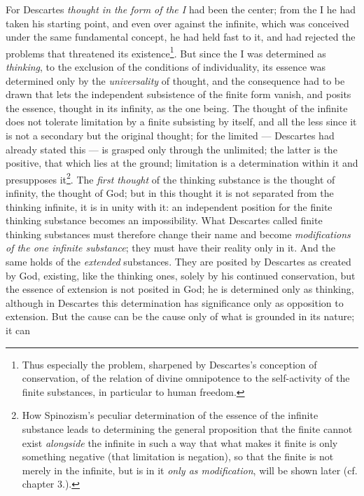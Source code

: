 \documentclass[12pt,a4paper,openany]{book}
\newcommand{\opage}[1]{\marginnote{\footnotesize\textit{[#1]}}}
\begin{document}
\opage{22}\setcounter{footnote}{0}For Descartes \emph{thought in the form of
the I} had been the center; from the I he had taken his starting point,
and even over against the infinite, which was conceived under the same
fundamental concept, he had held fast to it, and had rejected the
problems that threatened its existence\footnote{Thus especially the
problem, sharpened by Descartes's conception of conservation, of the
relation of divine omnipotence to the self-activity of the finite
substances, in particular to human freedom.}. But since the I was
determined as \emph{thinking}, to the exclusion of the conditions of
individuality, its essence was determined only by the
\emph{universality} of thought, and the consequence had to be drawn that
lets the independent subsistence of the finite form vanish, and posits
the essence, thought in its infinity, as the one being. The thought of
the infinite does not tolerate limitation by a finite subsisting by
itself, and all the less since it is not a secondary but the original
thought; for the limited --- Descartes had already stated this --- is
grasped only through the unlimited; the latter is the positive, that
which lies at the ground; limitation is a determination within it and
presupposes it\footnote{How Spinozism's peculiar determination of the
essence of the infinite substance leads to determining the general
proposition that the finite cannot exist \emph{alongside} the infinite
in such a way that what makes it finite is only something negative
(that limitation is negation), so that the finite is not merely in the
infinite, but is in it \emph{only as modification}, will be shown later
(cf. chapter 3.).}. The \emph{first thought} of the thinking substance is
the thought of infinity, the thought of God; but in this thought it is
not separated from the thinking infinite, it is in unity with it: an
independent position for the finite thinking substance becomes an
impossibility. What Descartes called finite thinking substances must
therefore change their name and become \emph{modifications of the one
infinite substance}; they must have their reality only in it. And the
same holds of the \emph{extended} substances. They are posited by
Descartes
\opage{23}as created by God, existing, like the thinking ones, solely by
his continued conservation, but the essence of extension is not posited
in God; he is determined only as thinking, although in Descartes this
determination has significance only as opposition to extension. But the
cause can be the cause only of what is grounded in its nature; it can
\end{document}

